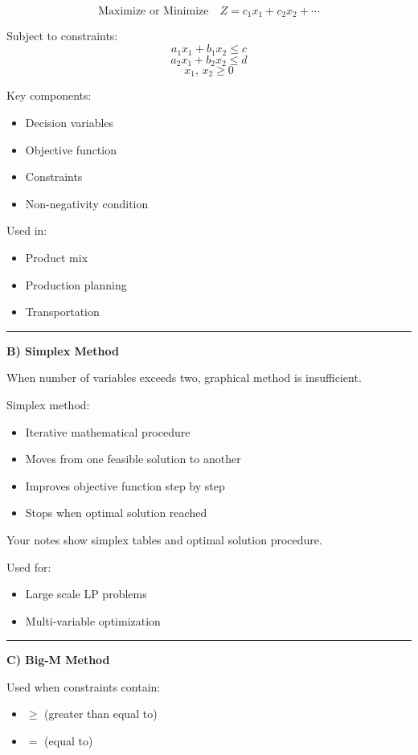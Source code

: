 \documentclass[10pt,a4paper]{article}
\newcommand{\separator}{\vspace{0.4em}\noindent\rule{\linewidth}{0.6pt}\vspace{0.4em}}
\begin{document}
\[
\text{Maximize or Minimize} \quad Z = c_1 x_1 + c_2 x_2 + \cdots
\]

Subject to constraints:
\[
a_1 x_1 + b_1 x_2 \leq c
\]
\[
a_2 x_1 + b_2 x_2 \leq d
\]
\[
x_1,\, x_2 \geq 0
\]

Key components:
\begin{itemize}
  \item Decision variables
  \item Objective function
  \item Constraints
  \item Non-negativity condition
\end{itemize}

Used in:
\begin{itemize}
  \item Product mix
  \item Production planning
  \item Transportation
\end{itemize}

\separator

\textbf{B) Simplex Method}

When number of variables exceeds two, graphical method is insufficient.

Simplex method:
\begin{itemize}
  \item Iterative mathematical procedure
  \item Moves from one feasible solution to another
  \item Improves objective function step by step
  \item Stops when optimal solution reached
\end{itemize}

Your notes show simplex tables and optimal solution procedure.

Used for:
\begin{itemize}
  \item Large scale LP problems
  \item Multi-variable optimization
\end{itemize}

\separator

\textbf{C) Big-M Method}

Used when constraints contain:
\begin{itemize}
  \item $\geq$ (greater than equal to)
  \item $=$ (equal to)
\end{itemize}
\end{document}
